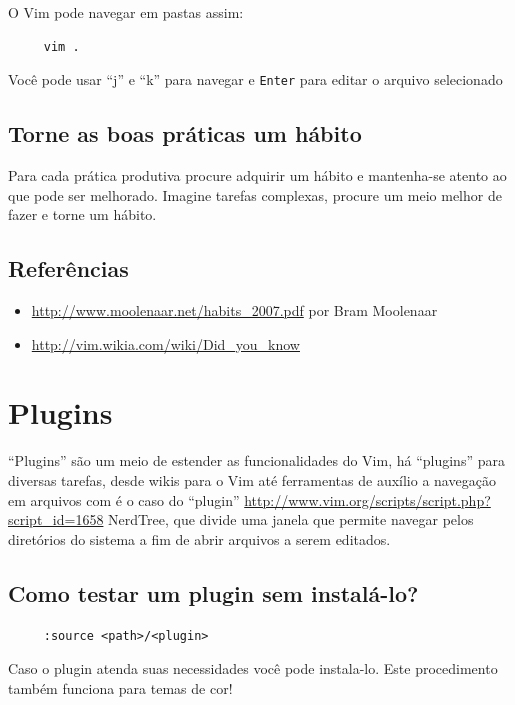 \documentclass[10pt,a4paper,openany]{book}
\begin{document}
O Vim pode navegar em pastas assim:

\begin{verbatim}
     vim .
\end{verbatim}

Você pode usar ``j'' e ``k'' para navegar e {\tt Enter} para editar o arquivo
selecionado

\section{Torne as boas práticas um hábito }\label{Torne as boas práticas um hábito }

Para cada prática produtiva procure adquirir um hábito e mantenha-se
atento ao que pode ser melhorado. Imagine tarefas complexas, procure
um meio melhor de fazer e torne um hábito.

\section{Referências}
\label{Referências}
\begin{itemize}
   \item \url{http://www.moolenaar.net/habits\_2007.pdf} por Bram Moolenaar
   \item \url{http://vim.wikia.com/wiki/Did\_you\_know}
\end{itemize}


\chapter{Plugins}\label{Plugins}

``Plugins'' são um meio de estender as funcionalidades do Vim, há
``plugins'' para diversas tarefas, desde wikis para o Vim até
ferramentas de auxílio a navegação em arquivos com é o caso do
``plugin'' \url{http://www.vim.org/scripts/script.php?script\_id=1658}
NerdTree, que divide uma janela que permite navegar pelos diretórios
do sistema a fim de abrir arquivos a serem editados.

\section{Como testar um plugin sem instalá-lo?}
\label{Como testar um plugin sem instala-lo?}

\begin{verbatim}
     :source <path>/<plugin>
\end{verbatim}

Caso o plugin atenda suas necessidades você pode instala-lo. Este
procedimento também funciona para temas de cor!
\end{document}
